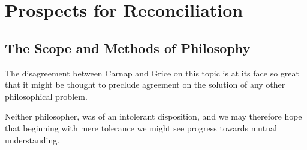 \documentclass[10pt,titlepage]{book}
\newcommand{\ignore}[1]{}
\begin{document}
\ignore{
\subsection{Positivism}

Next I'd like to address the differing perceptions of Speranza and myself in relation to Grice's attitude towards such as Carnap.

Grice thought of himself as a kind of ``ordinary language philosopher'' or at the least, a philosopher who saw some point and philosophical value in studying ``ordinary language'' as it is.
His predecessor Austin severely criticised aspects of positivism in his ``Sense and Sensibility'', and appeared an implacable opponent.

Grice's position was more moderate, several parts of his work made him appear to me less antagonistic.

\subsection{Reductionism}\index{reductionism}

We want to know whether the very specific kind of reductionism which Grice's rejected would embrace any or all of Carnap's reductionist tendencies.

Now, according to Speranza, the specific notion of reductionism which Grice rejected was that of reductive analysis of semantics in which the reduction takes place to some single kind of entity.
This looks like it is intended to include dogmatic Phenomenalism as a doctrine about semantics, which, apart from the dogmatic bit is what Carnap was doing in the Aufbau.
}

\chapter{Prospects for Reconciliation}

\section{The Scope and Methods of Philosophy}

The disagreement between Carnap and Grice on this topic is at its face
so great that it might be thought to preclude agreement on the
solution of any other philosophical problem.

Neither philosopher, was of an intolerant disposition, and we may
therefore hope that beginning with mere tolerance we might see
progress towards mutual understanding.
\end{document}
